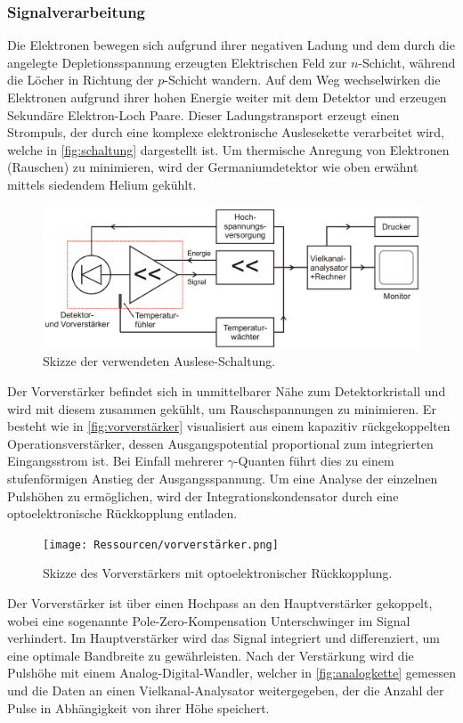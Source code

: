 \subsubsection{Signalverarbeitung}
Die Elektronen bewegen sich aufgrund ihrer negativen Ladung und dem durch die angelegte Depletionsspannung erzeugten Elektrischen Feld zur $n$-Schicht, während die Löcher in Richtung der $p$-Schicht wandern. Auf dem Weg wechselwirken die Elektronen aufgrund ihrer hohen Energie weiter mit dem Detektor und erzeugen Sekundäre Elektron-Loch Paare. Dieser Ladungstransport erzeugt einen Strompuls, der durch eine komplexe elektronische Auslesekette verarbeitet wird, welche in \autoref{fig:schaltung} dargestellt ist.  Um thermische Anregung von Elektronen (Rauschen) zu minimieren, wird der Germaniumdetektor wie oben erwähnt mittels siedendem Helium gekühlt.
\begin{figure}[H]
  \centering
  \includegraphics[scale=0.3]{Ressourcen/schaltung.png}
  \caption{Skizze der verwendeten Auslese-Schaltung.\cite{anleitung}}
  \label{fig:schaltung}
\end{figure}
Der Vorverstärker befindet sich in unmittelbarer Nähe zum Detektorkristall und wird mit diesem zusammen gekühlt, um Rauschspannungen zu minimieren. Er besteht wie in \autoref{fig:vorverstärker} visualisiert aus einem kapazitiv rückgekoppelten Operationsverstärker, dessen Ausgangspotential proportional zum integrierten Eingangsstrom ist. Bei Einfall mehrerer $\gamma$-Quanten führt dies zu einem stufenförmigen Anstieg der Ausgangsspannung. Um eine Analyse der einzelnen Pulshöhen zu ermöglichen, wird der Integrationskondensator durch eine optoelektronische Rückkopplung entladen.
\begin{figure}[H]
  \centering
  \texttt{[image: Ressourcen/vorverstärker.png]}
  \caption{Skizze des Vorverstärkers mit optoelektronischer Rückkopplung.\cite{anleitung}}
  \label{fig:vorverstärker}
\end{figure}
Der Vorverstärker ist über einen Hochpass an den Hauptverstärker gekoppelt, wobei eine sogenannte Pole-Zero-Kompensation Unterschwinger im Signal verhindert. Im Hauptverstärker wird das Signal integriert und differenziert, um eine optimale Bandbreite zu gewährleisten. Nach der Verstärkung wird die Pulshöhe mit einem Analog-Digital-Wandler, welcher in \autoref{fig:analogkette} gemessen und die Daten an einen Vielkanal-Analysator weitergegeben, der die Anzahl der Pulse in Abhängigkeit von ihrer Höhe speichert.
